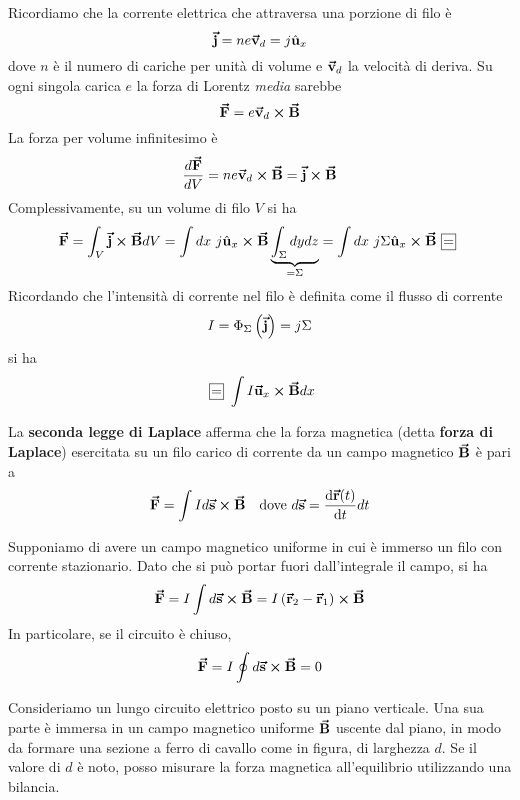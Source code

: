 Ricordiamo che la corrente elettrica che attraversa una porzione di filo è
\begin{equation*}
	\vb*{\va{j}}=ne\vb*{\va{v}}_d=j\hat{\mathbf{u}}_x
\end{equation*}
dove $n$ è il numero di cariche per unità di volume e $\vb*{\va{v}}_d$ la velocità di deriva. Su ogni singola carica $e$ la forza di Lorentz \textit{media} sarebbe
\begin{equation*}
	\vb*{\va{F}}=e\vb*{\va{v}}_d\cross\vb*{\va{B}}
\end{equation*}
La forza per volume infinitesimo è
\begin{equation*}
	\frac{d\vb*{\va{F}}}{dV}=ne\vb*{\va{v}}_d\cross\vb*{\va{B}}=\vb*{\va{j}}\cross\vb*{\va{B}}
\end{equation*}
Complessivamente, su un volume di filo $V$ si ha
\begin{equation}
	\vba{F}=\int_V\vba{j}\cross\vba{B}dV=\int dx\ j\vbh{u}_x\cross\vba{B}\underbrace{\int_{\Sigma}dydz}_{=\Sigma}=\int dx\ j\Sigma \vbh{u}_x\cross\vba{B}\squarequal
\end{equation}
Ricordando che l'intensità di corrente nel filo è definita come il flusso di corrente
\begin{equation*}
	I=\Phi_{\Sigma}\left(\vb*{\va{j}}\right)=j\Sigma
\end{equation*}
si ha
\begin{equation*}
	\squarequal\int I\vba{u}_x\cross\vba{B}dx
\end{equation*}
\begin{define}
	La \textbf{seconda legge di Laplace} afferma che la forza magnetica (detta \textbf{forza di Laplace}) esercitata su un filo carico di corrente da un campo magnetico $\vb*{\va{B}}$ è pari a
	\begin{align}
		\vba{F}=\int I d\vba{s}\cross\vba{B}&& \text{dove}\ d\vba{s}=\dv{\vba{r}(t)}{t}dt
	\end{align}
\end{define}
\begin{example}\label{RisultateSpiraNulla}
	Supponiamo di avere un campo magnetico uniforme in cui è immerso un filo con corrente stazionario. Dato che si può portar fuori dall'integrale il campo, si ha
	\begin{equation}
		\vb*{\va{F}}=I\int d\vb*{\va{s}}\cross\vb*{\va{B}}=I\left(\vb*{\va{r}}_2-\vb*{\va{r}}_1\right)\cross\vb*{\va{B}}
	\end{equation}
In particolare, se il circuito è chiuso,
\begin{equation}
	\vb*{\va{F}}=I\oint d\vb*{\va{s}}\cross\vb*{\va{B}}=0
\end{equation}
\end{example}
\begin{observe}
	Consideriamo un lungo circuito elettrico posto su un piano verticale. Una sua parte è immersa in un campo magnetico uniforme $\vb*{\va{B}}$ uscente dal piano, in modo da formare una sezione a ferro di cavallo come in figura, di larghezza $d$.
	Se il valore di $d$ è noto, posso misurare la forza magnetica all'equilibrio utilizzando una bilancia.
\end{observe}

